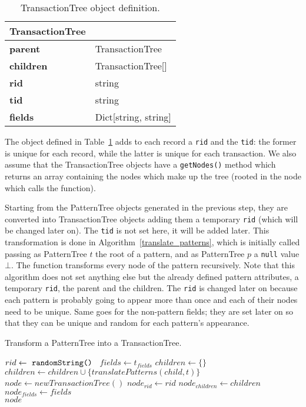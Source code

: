 \documentclass{acm_proc_article-sp-sigmod09}
\begin{document}
\begin{table}[H]
\centering
\begin{tabular}{|ll|} \hline
\textbf{TransactionTree} & \\ \hline
\textbf{parent} & TransactionTree \\ \hline
\textbf{children} & TransactionTree[] \\ \hline
\textbf{rid} & string \\ \hline
\textbf{tid} & string \\ \hline
\textbf{fields} & Dict[string, string] \\
\hline\end{tabular}
\caption{TransactionTree object definition.}
\label{tab:transactiontree}
\end{table}

The object defined in Table~\ref{tab:transactiontree} adds to each record a \texttt{rid} and the \texttt{tid}: the former is unique for each record, while the latter is unique for each transaction. We also assume that the TransactionTree objects have a \texttt{getNodes()} method which returns an array containing the nodes which make up the tree (rooted in the node which calls the function).

Starting from the PatternTree objects generated in the previous step, they are converted into TransactionTree objects adding them a temporary \texttt{rid} (which will be changed later on). The \texttt{tid} is not set here, it will be added later. This transformation is done in Algorithm~\ref{translate_patterns}, which is initially called passing as PatternTree $t$ the root of a pattern, and as PatternTree $p$ a \texttt{null} value $\bot$. The function transforms every node of the pattern recursively. Note that this algorithm does not set anything else but the already defined pattern attributes, a temporary \texttt{rid}, the parent and the children. The \texttt{rid} is changed later on because each pattern is probably going to appear more than once and each of their nodes need to be unique. Same goes for the non-pattern fields; they are set later on so that they can be unique and random for each pattern's appearance. 

\begin{algorithm}
\caption{Transform a PatternTree into a TransactionTree.}
\label{translate_patterns}
\begin{algorithmic}[1]
\State $rid \gets \text{ \texttt{randomString() }}$
\State $fields \gets t_{fields}$
\State $children \gets \{\}$
	\State $children \gets children \cup \{translatePatterns(child, t)\}$
\EndFor
\State $node \gets new TransactionTree()$
\State $node_{rid} \gets rid$
\State $node_{children} \gets children$
\State $node_{fields} \gets fields$ \\
\Return $node$
\EndFunction
\end{algorithmic}
\end{algorithm}
\end{document}
